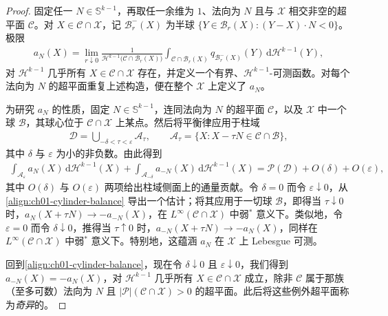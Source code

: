 \documentclass[../../main.tex]{subfiles}
\begin{document}
\begin{proof}
固定任一 $N\in\mathbb{S}^{k-1}$，再取任一余维为 $1$、法向为 $N$ 且与 $\mathscr{X}$ 相交非空的超平面 $\mathscr{C}$。对 $X\in\mathscr{C}\cap\mathscr{X}$，记 $\mathscr{B}_{r}^{-}(X)$ 为半球 $\{Y\in\mathscr{B}_{r}(X):(Y-X)\cdot N<0\}$。极限
\begin{align}
a_{N}(X)=\lim_{r\downarrow 0}\frac{1}{\mathscr{H}^{k-1}\bigl(\mathscr{C}\cap\mathscr{B}_{r}(X)\bigr)}\int_{\mathscr{C}\cap\mathscr{B}_{r}(X)}q_{\mathscr{B}_{r}^{-}(X)}(Y)\,\mathrm{d}\mathscr{H}^{k-1}(Y),\label{align:ch01-aN-limit}
\end{align}
对 $\mathscr{H}^{k-1}$ 几乎所有 $X\in\mathscr{C}\cap\mathscr{X}$ 存在，并定义一个有界、$\mathscr{H}^{k-1}$-可测函数。对每个法向为 $N$ 的超平面重复上述构造，便在整个 $\mathscr{X}$ 上定义了 $a_{N}$。

为研究 $a_{N}$ 的性质，固定 $N\in\mathbb{S}^{k-1}$，连同法向为 $N$ 的超平面 $\mathscr{C}$，以及 $\mathscr{X}$ 中一个球 $\mathscr{B}$，其球心位于 $\mathscr{C}\cap\mathscr{X}$ 上某点。然后将平衡律应用于柱域
\begin{align}
\mathscr{D}=\bigcup_{-\delta<\tau<\varepsilon}\mathscr{A}_{\tau},\qquad
\mathscr{A}_{\tau}=\{X:X-\tau N\in\mathscr{C}\cap\mathscr{B}\},\label{align:ch01-cylinder}
\end{align}
其中 $\delta$ 与 $\varepsilon$ 为小的非负数。由此得到
\begin{align}
\int_{\mathscr{A}_{\varepsilon}}a_{N}(X)\,\mathrm{d}\mathscr{H}^{k-1}(X)+\int_{\mathscr{A}_{-\delta}}a_{-N}(X)\,\mathrm{d}\mathscr{H}^{k-1}(X)=\mathscr{P}(\mathscr{D})+O(\delta)+O(\varepsilon),\label{align:ch01-cylinder-balance}
\end{align}
其中 $O(\delta)$ 与 $O(\varepsilon)$ 两项给出柱域侧面上的通量贡献。令 $\delta=0$ 而令 $\varepsilon\downarrow 0$，从\cref{align:ch01-cylinder-balance} 导出一个估计；将其应用于一切球 $\mathscr{B}$，即得当 $\tau\downarrow 0$ 时，$a_{N}(X+\tau N)\to -a_{-N}(X)$，在 $L^{\infty}(\mathscr{C}\cap\mathscr{X})$ 中弱$^{*}$ 意义下。类似地，令 $\varepsilon=0$ 而令 $\delta\downarrow 0$，推得当 $\tau\uparrow 0$ 时，$a_{-N}(X+\tau N)\to -a_{N}(X)$，同样在 $L^{\infty}(\mathscr{C}\cap\mathscr{X})$ 中弱$^{*}$ 意义下。特别地，这蕴涵 $a_{N}$ 在 $\mathscr{X}$ 上 Lebesgue 可测。

回到\cref{align:ch01-cylinder-balance}，现在令 $\delta\downarrow 0$ 且 $\varepsilon\downarrow 0$，我们得到 $a_{-N}(X)=-a_{N}(X)$，对 $\mathscr{H}^{k-1}$ 几乎所有 $X\in\mathscr{C}\cap\mathscr{X}$ 成立，除非 $\mathscr{C}$ 属于那族（至多可数）法向为 $N$ 且 $|\mathscr{P}|(\mathscr{C}\cap\mathscr{X})>0$ 的超平面。此后将这些例外超平面称为\emph{奇异}的。


\end{proof}
\end{document}
